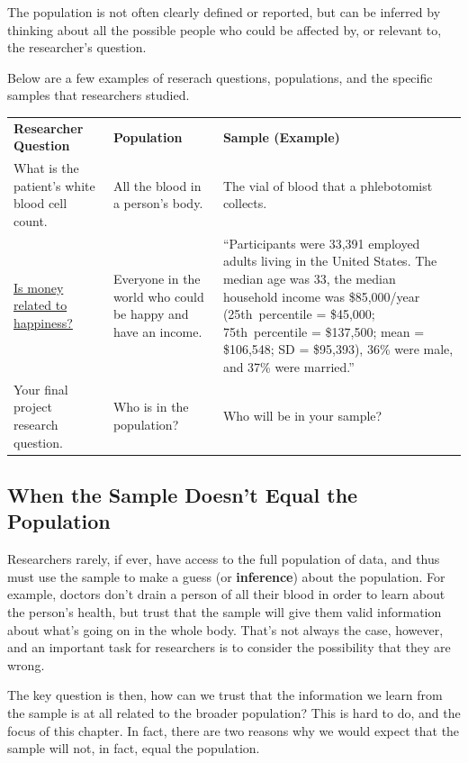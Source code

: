 \documentclass[
  letterpaper,
  DIV=11,
  numbers=noendperiod,
  oneside]{scrreprt}
\begin{document}
The population is not often clearly defined or reported, but can be
inferred by thinking about all the possible people who could be affected
by, or relevant to, the researcher's question.

Below are a few examples of reserach questions, populations, and the
specific samples that researchers studied.

\begin{longtable}[]{@{}
  >{\raggedright\arraybackslash}p{}
  >{\raggedright\arraybackslash}p{}
  >{\raggedright\arraybackslash}p{}@{}}
\toprule\noalign{}
\endhead
\bottomrule\noalign{}
\endlastfoot
\textbf{Researcher Question} & \textbf{Population} & \textbf{Sample
(Example)} \\
What is the patient's white blood cell count. & All the blood in a
person's body. & The vial of blood that a phlebotomist collects. \\
\href{https://www.pnas.org/doi/10.1073/pnas.2208661120}{Is money related
to happiness?} & Everyone in the world who could be happy and have an
income. & ``Participants were 33,391 employed adults living in the
United States. The median age was 33, the median household income was
\$85,000/year (25th~percentile = \$45,000; 75th~percentile = \$137,500;
mean = \$106,548; SD = \$95,393), 36\% were male, and 37\% were
married.'' \\
Your final project research question. & Who is in the population? & Who
will be in your sample? \\
\end{longtable}

\subsection{When the Sample Doesn't Equal the
Population}\label{when-the-sample-doesnt-equal-the-population}

Researchers rarely, if ever, have access to the full population of data,
and thus must use the sample to make a guess (or \textbf{inference})
about the population. For example, doctors don't drain a person of all
their blood in order to learn about the person's health, but trust that
the sample will give them valid information about what's going on in the
whole body. That's not always the case, however, and an important task
for researchers is to consider the possibility that they are wrong.

The key question is then, how can we trust that the information we learn
from the sample is at all related to the broader population? This is
hard to do, and the focus of this chapter. In fact, there are two
reasons why we would expect that the sample will not, in fact, equal the
population.
\end{document}
